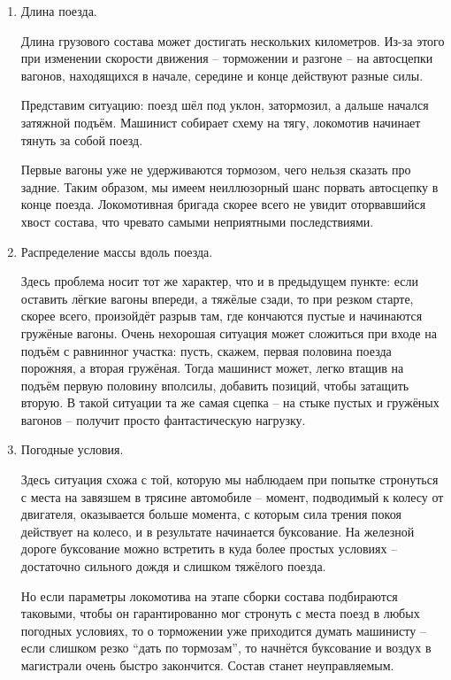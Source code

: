 \begin{enumerate}
\item Длина поезда.

Длина грузового состава может достигать нескольких километров. Из-за этого при изменении скорости движения -- торможении и разгоне -- на автосцепки вагонов, находящихся в начале, середине и конце действуют разные силы.

Представим ситуацию: поезд шёл под уклон, затормозил, а дальше начался затяжной подъём. Машинист собирает схему на тягу, локомотив начинает тянуть за собой поезд.

Первые вагоны уже не удерживаются тормозом, чего нельзя сказать про задние. Таким образом, мы имеем неиллюзорный шанс порвать автосцепку в конце поезда. Локомотивная бригада скорее всего не увидит оторвавшийся хвост состава, что чревато самыми неприятными последствиями.

\item Распределение массы вдоль поезда.

Здесь проблема носит тот же характер, что и в предыдущем пункте: если оставить лёгкие вагоны впереди, а тяжёлые сзади, то при резком старте, скорее всего, произойдёт разрыв там, где кончаются пустые и начинаются гружёные вагоны. Очень нехорошая ситуация может сложиться при входе на подъём с равнинног участка: пусть, скажем, первая половина поезда порожняя, а вторая гружёная. Тогда машинист может, легко втащив на подъём первую половину вполсилы, добавить позиций, чтобы затащить вторую. В такой ситуации та же самая сцепка -- на стыке пустых и гружёных вагонов -- получит просто фантастическую нагрузку.

\item Погодные условия.

Здесь ситуация схожа с той, которую мы наблюдаем при попытке стронуться с места на завязшем в трясине автомобиле -- момент, подводимый к колесу от двигателя, оказывается больше момента, с которым сила трения покоя действует на колесо, и в результате начинается буксование. На железной дороге буксование можно встретить в куда более простых условиях -- достаточно сильного дождя и слишком тяжёлого поезда.

Но если параметры локомотива на этапе сборки состава подбираются таковыми, чтобы он гарантированно мог стронуть с места поезд в любых погодных условиях, то о торможении уже приходится думать машинисту -- если слишком резко ``дать по тормозам'', то начнётся буксование и воздух в магистрали очень быстро закончится. Состав станет неуправляемым.
\end{enumerate}

